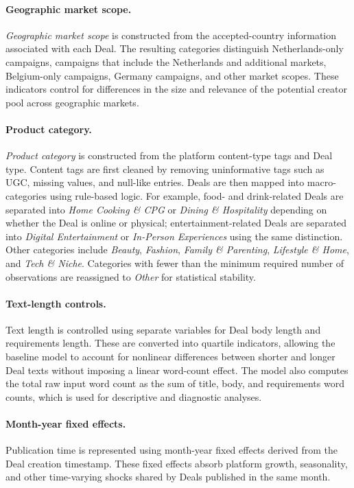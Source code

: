 \paragraph{Geographic market scope.}
\textit{Geographic market scope} is constructed from the accepted-country information associated with each Deal. The resulting categories distinguish Netherlands-only campaigns, campaigns that include the Netherlands and additional markets, Belgium-only campaigns, Germany campaigns, and other market scopes. These indicators control for differences in the size and relevance of the potential creator pool across geographic markets.

\paragraph{Product category.}
\textit{Product category} is constructed from the platform content-type tags and Deal type. Content tags are first cleaned by removing uninformative tags such as UGC, missing values, and null-like entries. Deals are then mapped into macro-categories using rule-based logic. For example, food- and drink-related Deals are separated into \textit{Home Cooking \& CPG} or \textit{Dining \& Hospitality} depending on whether the Deal is online or physical; entertainment-related Deals are separated into \textit{Digital Entertainment} or \textit{In-Person Experiences} using the same distinction. Other categories include \textit{Beauty}, \textit{Fashion}, \textit{Family \& Parenting}, \textit{Lifestyle \& Home}, and \textit{Tech \& Niche}. Categories with fewer than the minimum required number of observations are reassigned to \textit{Other} for statistical stability.

\paragraph{Text-length controls.}
Text length is controlled using separate variables for Deal body length and requirements length. These are converted into quartile indicators, allowing the baseline model to account for nonlinear differences between shorter and longer Deal texts without imposing a linear word-count effect. The model also computes the total raw input word count as the sum of title, body, and requirements word counts, which is used for descriptive and diagnostic analyses.

\paragraph{Month-year fixed effects.}
Publication time is represented using month-year fixed effects derived from the Deal creation timestamp. These fixed effects absorb platform growth, seasonality, and other time-varying shocks shared by Deals published in the same month.


